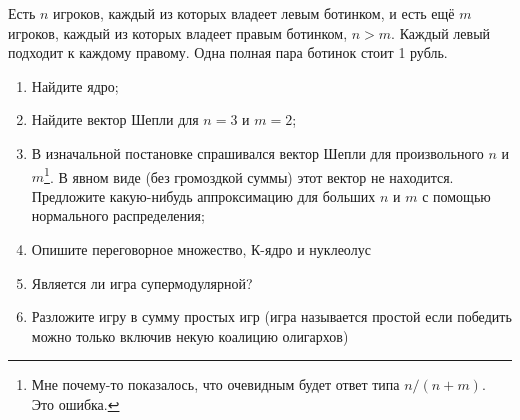 \begin{problem}[Ботинки-2.]

Есть $n$ игроков, каждый из которых владеет левым ботинком, и есть ещё $m$ игроков, каждый из которых владеет правым ботинком, $n>m$. Каждый левый подходит к каждому правому. Одна полная пара ботинок стоит 1 рубль.

\begin{enumerate}
\item Найдите ядро;

\item Найдите вектор Шепли для $n=3$ и $m=2$;

\item В изначальной постановке спрашивался вектор Шепли для произвольного $n$ и $m$\footnote{Мне почему-то показалось, что очевидным будет ответ типа $n/(n+m)$. Это ошибка.}. В явном виде (без громоздкой суммы) этот вектор не находится. Предложите какую-нибудь аппроксимацию для больших $n$ и $m$ с помощью нормального распределения;

\item Опишите переговорное множество, К-ядро и нуклеолус

\item Является ли игра супермодулярной?

\item Разложите игру в сумму простых игр (игра называется простой если победить можно только включив некую коалицию олигархов) 
\end{enumerate}



\begin{sol}

\end{sol}
\end{problem}



